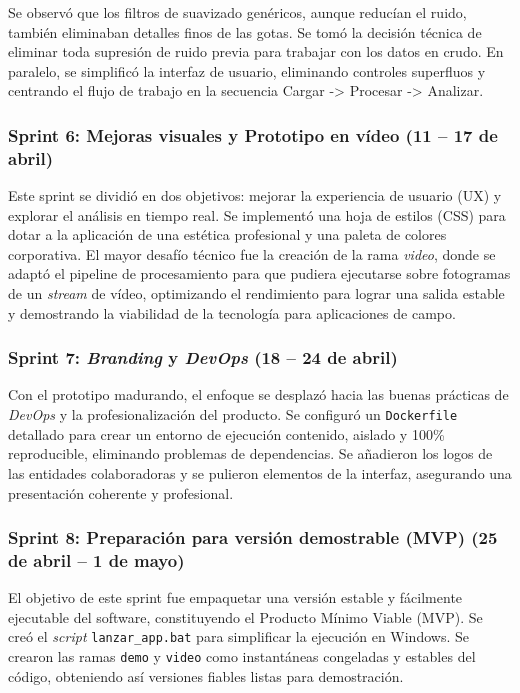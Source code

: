 Se observó que los filtros de suavizado genéricos, aunque reducían el ruido, también eliminaban detalles finos de las gotas. Se tomó la decisión técnica de eliminar toda supresión de ruido previa para trabajar con los datos en crudo. En paralelo, se simplificó la interfaz de usuario, eliminando controles superfluos y centrando el flujo de trabajo en la secuencia Cargar -> Procesar -> Analizar.

\subsubsection{Sprint 6: Mejoras visuales y Prototipo en vídeo (11 – 17 de abril)}

Este sprint se dividió en dos objetivos: mejorar la experiencia de usuario (UX) y explorar el análisis en tiempo real. Se implementó una hoja de estilos (CSS) para dotar a la aplicación de una estética profesional y una paleta de colores corporativa. El mayor desafío técnico fue la creación de la rama \textit{video}, donde se adaptó el pipeline de procesamiento para que pudiera ejecutarse sobre fotogramas de un \textit{stream} de vídeo, optimizando el rendimiento para lograr una salida estable y demostrando la viabilidad de la tecnología para aplicaciones de campo.

\subsubsection{Sprint 7: \textit{Branding} y \textit{DevOps} (18 – 24 de abril)}

Con el prototipo madurando, el enfoque se desplazó hacia las buenas prácticas de \textit{DevOps} y la profesionalización del producto. Se configuró un \verb|Dockerfile| detallado para crear un entorno de ejecución contenido, aislado y 100\% reproducible, eliminando problemas de dependencias. Se añadieron los logos de las entidades colaboradoras y se pulieron elementos de la interfaz, asegurando una presentación coherente y profesional.

\subsubsection{Sprint 8: Preparación para versión demostrable (MVP) (25 de abril – 1 de mayo)}

El objetivo de este sprint fue empaquetar una versión estable y fácilmente ejecutable del software, constituyendo el Producto Mínimo Viable (MVP). Se creó el \textit{script} \verb|lanzar_app.bat| para simplificar la ejecución en Windows. Se crearon las ramas \verb|demo| y \verb|video| como instantáneas congeladas y estables del código, obteniendo así versiones fiables listas para demostración.

